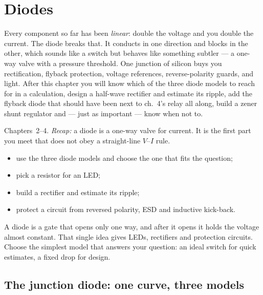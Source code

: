 \chapter{Diodes}\label{ch:diodes}

Every component so far has been \emph{linear}: double the voltage and you
double the current. The diode breaks that. It conducts in one direction
and blocks in the other, which sounds like a switch but behaves like
something subtler --- a one-way valve with a pressure threshold. One
junction of silicon buys you rectification, flyback protection, voltage
references, reverse-polarity guards, and light. After this chapter you
will know which of the three diode models to reach for in a calculation,
design a half-wave rectifier and estimate its ripple, add the flyback
diode that should have been next to ch.~4's relay all along, build a
zener shunt regulator and --- just as important --- know when not to.

\begin{rulebox}
Chapters~2--4. \emph{Recap:} a diode is a one-way valve for current. It is the first part you meet that does not obey a straight-line $V$--$I$ rule.
\end{rulebox}
\begin{wins}
\begin{itemize}
\item use the three diode models and choose the one that fits the question;
\item pick a resistor for an LED;
\item build a rectifier and estimate its ripple;
\item protect a circuit from reversed polarity, ESD and inductive kick-back.
\end{itemize}
\end{wins}
\begin{principle}
A diode is a gate that opens only one way, and after it opens it holds the voltage almost constant. That single idea gives LEDs, rectifiers and protection circuits. Choose the simplest model that answers your question: an ideal switch for quick estimates, a fixed drop for design.
\end{principle}

\section{The junction diode: one curve, three models}\label{sec:diode-iv}


